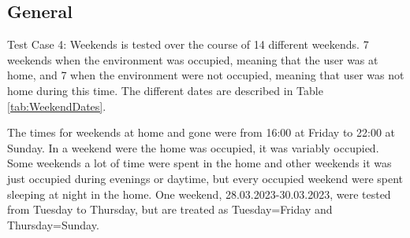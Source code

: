 \subsection{General}
Test Case 4: Weekends is tested over the course of 14 different weekends. 7 weekends when the environment was occupied, meaning that the user was at home, and 7 when the environment were not occupied, meaning that user was not home during this time. The different dates are described in Table \ref{tab:WeekendDates}. 
\begin{table}[H]
    \centering
    \caption{Dates for Test Case 4: Weekends}
    \label{tab:WeekendDates}
\end{table}

The times for weekends at home and gone were from 16:00 at Friday to 22:00 at Sunday. In a weekend were the home was occupied, it was variably occupied. Some weekends a lot of time were spent in the home and other weekends it was just occupied during evenings or daytime, but every occupied weekend were spent sleeping at night in the home. One weekend, 28.03.2023-30.03.2023, were tested from Tuesday to Thursday, but are treated as Tuesday=Friday and Thursday=Sunday. 

